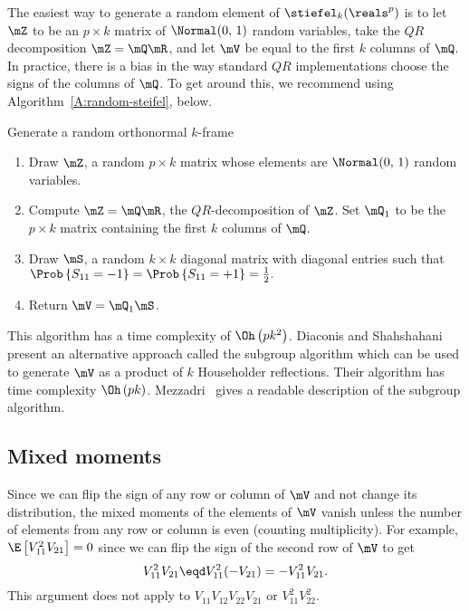 The easiest way to generate a random element of $\stiefel_k(\reals^p)$ is
to let $\mZ$ to be an $p \times k$ matrix of \iid $\Normal( 0, \, 1)$
random variables, take the $QR$ decomposition $\mZ = \mQ \mR$, and let
$\mV$ be equal to the first $k$ columns of $\mQ$.  In practice, there is
a bias in the way standard $QR$ implementations choose the signs of the
columns of $\mQ$.  To get around this, we recommend using 
Algorithm~\ref{A:random-steifel}, below.

\begin{algorithm}
    \caption{\label{A:random-steifel}Generate a random orthonormal $k$-frame}
    \begin{enumerate}
        \item Draw $\mZ$, a random $p \times k$ matrix whose elements are 
              \iid $\Normal( 0, \, 1 )$ random variables.
              
        \item Compute $\mZ = \mQ \mR$, the $QR$-decomposition of $\mZ$.
              Set $\mQ_1$ to be the $p \times k$ matrix containing the
              first $k$ columns of $\mQ$.

        \item Draw $\mS$, a random $k \times k$ diagonal matrix with \iid 
              diagonal entries such that 
              \(
                  \Prob\left\{ S_{11} = -1 \right\}
                  =
                  \Prob\left\{ S_{11} = +1 \right\}
                  =
                  \frac{1}{2}.
              \)
        \item Return $\mV = \mQ_1 \mS$.
    \end{enumerate}
\end{algorithm}

\noindent 
This algorithm has a time complexity of $\Oh\left( p k^2 \right)$. Diaconis
and Shahshahani~\cite{diaconis1987sag} present an alternative approach called
the subgroup algorithm which can be used to generate $\mV$ as a product of 
$k$ Householder reflections.  Their algorithm has time complexity 
$\Oh\left( p k \right)$.  Mezzadri~\cite{mezzadri2007grm} gives a readable 
description of the subgroup algorithm.


\subsection{Mixed moments}

Since we can flip the sign of any row or column of $\mV$ and not change
its distribution, the mixed moments of the elements of $\mV$ vanish unless 
the number of elements from any row or column is even (counting multiplicity).  For example, $\E \left[ V_{11}^2 V_{21} \right] = 0$ since we can flip the sign of the second row of $\mV$ to get
\[
    V_{11}^2 V_{21} 
    \eqd
    V_{11}^2 (- V_{21})
    =
    -V_{11}^2 V_{21}.
\]
This argument does not apply to $V_{11} V_{12} V_{22} V_{21}$ or
$V_{11}^2 V_{22}^2$.


